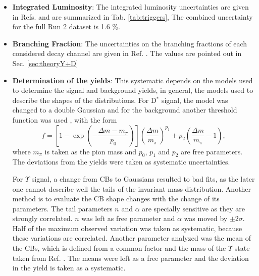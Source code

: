 \begin{itemize}
  \item \textbf{Integrated Luminosity}: The integrated luminosity uncertainties are given in Refs. \cite{CMS:2021xjt, CMS-PAS-LUM-17-004, CMS-PAS-LUM-18-002} and are summarized in Tab. \ref{tab:triggers}, The combined uncertainty for the full Run 2 dataset is 1.6 \%.
  \item \textbf{Branching Fraction}: The uncertainties on the branching fractions of each considered decay channel are given in Ref. \cite{Workman:2022ynf}. The values are pointed out in Sec. \ref{sec:theoryY+D}
  \item \textbf{Determination of the yields}: This systematic depends on the models used to determine the signal and background yields, in general, the models used to describe the shapes of the distributions. For D$^*$ signal, the model was changed to a double Gaussian and for the background another threshold function was used \cite{CMS:2021lab}, with the form
        \begin{equation}
          f = \left[ 1- \exp{\left( -\frac{\Delta m - m_\pi}{p_0} \right)} \right]\left( \frac{\Delta m}{m_\pi} \right)^{p_1} +p_2 \left( \frac
          {\Delta m}{m_\pi} - 1 \right),
        \end{equation}
        where $m_\pi$ is taken as the pion mass and $p_0$, $p_1$ and $p_2$ are free parameters. The deviations from the yields were taken as systematic uncertainties.

        For $\Upsilon$ signal, a change from CBs to Gaussians resulted to bad fits, as the later one cannot describe well the tails of the invariant mass distribution. Another method is to evaluate the CB shape changes with the change of its parameters. The tail parameters $n$ and $\alpha$ are specially sensitive as they are strongly correlated. $n$ was left as free parameter and $\alpha$ was moved by $\pm 2\sigma$. Half of the maximum observed variation was taken as systematic, because these variations are correlated. Another parameter analyzed was the mean of the CBs, which is defined from a common factor and the mass of the $\Upsilon$ state taken from Ref. \cite{Workman:2022ynf}. The means were left as a free parameter and the deviation in the yield is taken as a systematic.


\end{itemize}
